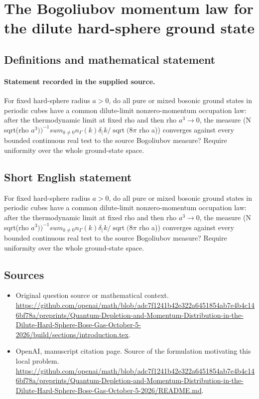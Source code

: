 \documentclass[11pt]{article}
\begin{document}
\section*{The Bogoliubov momentum law for the dilute hard-sphere ground state}\label{30007226}
\subsection{Definitions and mathematical statement}
\paragraph{Statement recorded in the supplied source.}
For fixed hard-sphere radius $a>0$, do all pure or mixed bosonic ground states in periodic cubes have a common dilute-limit nonzero-momentum occupation law: after the thermodynamic limit at fixed rho and then rho $a^3\to 0$, the measure (N sqrt(rho $a^3))^{-1}sum_{k\neq 0}n_\Gamma (k)\delta _(k/\operatorname{sqrt}(8\pi $ rho a)) converges against every bounded continuous real test to the source Bogoliubov measure? Require uniformity over the whole ground-state space.
\subsection{Short English statement}
For fixed hard-sphere radius $a>0$, do all pure or mixed bosonic ground states in periodic cubes have a common dilute-limit nonzero-momentum occupation law: after the thermodynamic limit at fixed rho and then rho $a^3\to 0$, the measure (N sqrt(rho $a^3))^{-1}sum_{k\neq 0}n_\Gamma (k)\delta _(k/\operatorname{sqrt}(8\pi $ rho a)) converges against every bounded continuous real test to the source Bogoliubov measure? Require uniformity over the whole ground-state space.
\subsection{Sources}
\begin{itemize}
\item[S1] Original question source or mathematical context.
\url{https://github.com/openai/math/blob/adc7f1241b42e322a6451854ab7e4b4c146bf78a/preprints/Quantum-Depletion-and-Momentum-Distribution-in-the-Dilute-Hard-Sphere-Bose-Gas-October-5-2026/build/sections/introduction.tex}.
\item[S2] OpenAI, manuscript citation page. Source of the formulation motivating this local problem.
\url{https://github.com/openai/math/blob/adc7f1241b42e322a6451854ab7e4b4c146bf78a/preprints/Quantum-Depletion-and-Momentum-Distribution-in-the-Dilute-Hard-Sphere-Bose-Gas-October-5-2026/README.md}.
\end{itemize}
\end{document}

